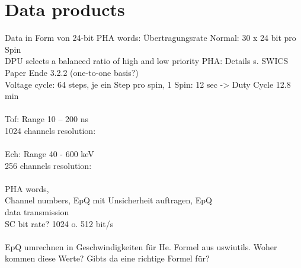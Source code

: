\section{Data products}
Data in Form von 24-bit PHA words: Übertragungsrate Normal: 30 x 24 bit pro Spin\\

DPU selects a balanced ratio of high and low priority PHA: Details s. SWICS Paper Ende 3.2.2 (one-to-one basis?) \\

Voltage cycle: 64 steps, je ein Step pro spin, 1 Spin: 12 sec -> Duty Cycle 12.8 min
\\ \\
Tof: Range 10 -- 200 ns \\
1024 channels
resolution:
\\ \\
Ech: Range 40 - 600 keV \\
256 channels
resolution:
\\ \\
PHA words,\\
Channel numbers, EpQ mit Unsicherheit auftragen, EpQ \\ 
data transmission \\
SC bit rate? 1024 o. 512 bit/s
\\ \\
EpQ umrechnen in Geschwindigkeiten für He. Formel aus uswiutils. Woher kommen diese Werte? Gibts da eine richtige Formel für?


